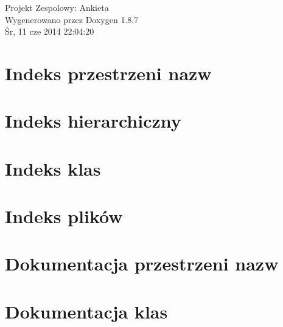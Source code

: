 \documentclass[twoside]{book}
\newcommand{\+}{\discretionary{\mbox{\scriptsize$\hookleftarrow$}}{}{}}
\newcommand{\clearemptydoublepage}{%
  \newpage{\pagestyle{empty}\cleardoublepage}%
}
\begin{document}
\hypersetup{pageanchor=false,
             bookmarks=true,
             bookmarksnumbered=true,
             pdfencoding=unicode
            }
\begin{titlepage}
\vspace*{7cm}
\begin{center}%
{\Large Projekt Zespolowy\+: Ankieta }\\
\vspace*{1cm}
{\large Wygenerowano przez Doxygen 1.8.7}\\
\vspace*{0.5cm}
{\small Śr, 11 cze 2014 22:04:20}\\
\end{center}
\end{titlepage}
\clearemptydoublepage
\tableofcontents
\clearemptydoublepage
{}
\hypersetup{pageanchor=true}

\chapter{Indeks przestrzeni nazw}

\chapter{Indeks hierarchiczny}

\chapter{Indeks klas}

\chapter{Indeks plików}

\chapter{Dokumentacja przestrzeni nazw}



\chapter{Dokumentacja klas}

















\end{document}

